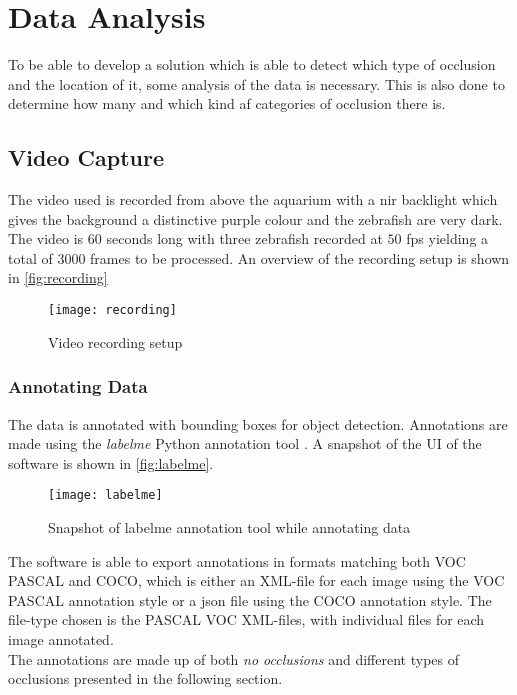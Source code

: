 \graphicspath{{figures/analysis/}}
\chapter{Data Analysis}\label{ch:data_anal}
To be able to develop a solution which is able to detect which type of occlusion and the location of it, some analysis of the data is necessary. This is also done to determine how many and which kind af categories of occlusion there is.



\section{Video Capture}
The video used is recorded from above the aquarium with a \gls{nir} backlight which gives the background a distinctive purple colour and the zebrafish are very dark. The video is $ 60 $ seconds long with three zebrafish recorded at $ 50 $ \gls{fps} yielding a total of $3000$ frames to be processed. An overview of the recording setup is shown in \autoref{fig:recording}

\begin{figure}[H]
	\centering
	\texttt{[image: recording]}
	\caption{Video recording setup}
	\label{fig:recording}
\end{figure}

\subsection{Annotating Data}
The data is annotated with bounding boxes for object detection. Annotations are made using the \textit{labelme} Python annotation tool \citep{labelme2016}. A snapshot of the UI of the software is shown in \autoref{fig:labelme}.

\begin{figure}[H]
	\centering
	\texttt{[image: labelme]}
	\caption{Snapshot of labelme annotation tool while annotating data}
	\label{fig:labelme}
\end{figure}

The software is able to export annotations in formats matching both VOC PASCAL and COCO, which is either an XML-file for each image using the VOC PASCAL annotation style or a json file using the COCO annotation style. The file-type chosen is the PASCAL VOC XML-files, with individual files for each image annotated.\\

The annotations are made up of both \textit{no occlusions} and different types of occlusions presented in the following section.

